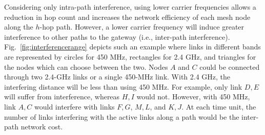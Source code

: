 Considering only intra-path interference, using lower carrier frequencies allows a
reduction in hop count and increases the network efficiency of each mesh node along
the $h$-hop path. However, a lower carrier frequency will induce greater interference
to other paths to the gateway (i.e., inter-path interference). 
Fig.~\ref{fig:interferencerange} depicts such an example where
links in different bands are represented by circles for 450 MHz, rectangles for
2.4 GHz, and triangles for the nodes which can choose between the two.
Nodes $A$ and $C$ could be connected through two 2.4-GHz links or a single 450-MHz link.
With 2.4 GHz, the interfering distance will be less than using 450 MHz. For example, only 
link $D,E$ will suffer from interference, whereas $H,I$ would not. However, with 450 MHz,
link $A,C$ would interfere with links $F,G$, $M,L$, and $K,J$. At each time unit, the number of
links interfering with the active links along a path would be the inter-path network cost.

